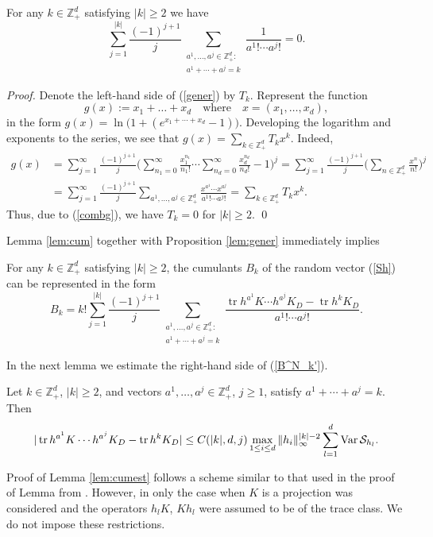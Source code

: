 \documentclass{article}
\numberwithin{equation}{section}
\newcommand{\SSS}{{\cal S}}
\newcommand{\tr}{\operatorname{tr}}
\newcommand{\Var}{\operatorname{Var}}
\newcommand{\ssk}{\smallskip}
\newcommand{\fr}{\frac}
\newcommand{\qmb}{\quad\mbox}
\newcommand{\qu}{\quad}
\newcommand{\sli}{\sum\limits}
\newcommand{\lbl}{\label}
\newcommand{\rlem}{Lemma \nolinebreak}
\newcommand{\bee}{\begin{equation}}
\newcommand{\eee}{\end{equation}}
\newcommand{\bl}{\begin{lem}}
\newcommand{\el}{\end{lem}}
\newcommand{\bpp}{\begin{prop}}
\newcommand{\epp}{\end{prop}}
\newcommand{\non}{\nonumber}
\newcommand{\sck}{\substack}
\newcommand{\Zp}{\mathbb{Z}^d_+}
\begin{document}
\bpp\lbl{lem:gener}
For any $k\in\Zp$ satisfying $|k|\geq 2$ we have
\bee
\lbl{gener}
\sli_{j=1}^{|k|}\fr{(-1)^{j+1}}{j}\sli_{\sck{a^1,\ldots,a^j\in\Zp: \\ a^1+\cdots+a^j=k}}
\fr{1}{a^1!\cdots a^j!} =0.
\eee
\epp
{\it Proof.}
Denote the left-hand side of (\ref{gener}) by $T_k$.
Represent the function
\bee\lbl{combg}
g(x):=x_1+\ldots+x_d
\qmb{where}\qu
x=(x_1,\ldots,x_d),
\eee
in the form
$g(x)=\ln \big(1+(e^{x_1+\cdots+x_d}-1 )\big)$.
Developing the logarithm and exponents to the series,
we see that
$g(x)=\sli_{k\in\Zp} T_k x^k$. Indeed,
\begin{align}\non
g(x)&=      \sli_{j=1}^{\infty}\fr{(-1)^{j+1}}{j}
        \Big( \sli_{n_1=0}^\infty \fr{x_1^{n_1}}{n_1!} \cdots \sli_{n_d=0}^\infty \fr{x_d^{n_d}}{n_d!} - 1 \Big)^j
    =   \sli_{j=1}^{\infty}\fr{(-1)^{j+1}}{j}
        \Big( \sli_{n\in\Zp} \fr{x^n}{n!} \Big)^j
        \\ \non
&=   \sli_{j=1}^{\infty}\fr{(-1)^{j+1}}{j}
        \sli_{a^1,\ldots,a^j\in\Zp}\fr{x^{a^1}\cdots x^{a^j}}{a^1!\cdots a^j!}
    =   \sli_{k\in\Zp} T_k x^k.
\end{align}
Thus, due to (\ref{combg}), we have
$T_k=0$ for $|k|\geq 2$.
\qed

\ssk
Lemma \ref{lem:cum} together with Proposition \ref{lem:gener} immediately implies
\begin{cor}
\lbl{cor:cum}
For any $k\in\Zp$ satisfying $|k|\geq 2$, the cumulants $B_k$
of the random vector (\ref{Sh}) can be represented in the form
\bee
\lbl{B^N_k'}
B_k=k!\sli_{j=1}^{|k|}\fr{(-1)^{j+1}}{j}\sli_{\sck{a^1,\ldots,a^j\in\Zp: \\ a^1+\cdots+a^j=k}}
\fr{\tr h^{a^1} K\cdots h^{a^j} K_D-\tr h^k K_D}{a^1!\cdots a^j!}.
\eee
\end{cor}

In the next lemma we estimate the right-hand side of (\ref{B^N_k'}).
\bl\lbl{lem:cumest}
Let $k\in\Zp$, $|k|\geq 2$, and vectors $a^1,\ldots, a^j\in\Zp$, $j\geq 1$, satisfy $a^1+\cdots+a^j=k$. Then
\bee\lbl{cumest}
|\tr h^{a^1}K\cdots h^{a^j}K_D - \tr h^k K_D|
\leq C(|k|,d,j) \max\limits_{1\leq i\leq d} \|h_i\|^{|k|-2}_\infty \sli_{l=1}^d \Var\SSS_{h_l}.
\eee
\el
Proof of \rlem \ref{lem:cumest} follows a scheme similar to that used in the proof of \rlem 3.2 from \cite{BD15}. However, in \cite{BD15} only the
case when $K$ is a projection was considered
and the operators $h_lK$, $Kh_l$ were assumed to be of the trace class.
We do not impose these restrictions.
\end{document}
